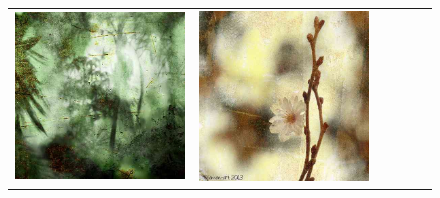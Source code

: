 \begin{figure}
\begin{minipage}[t]{\textwidth}
\begin{tabular}{m{.01\linewidth} m{.16\linewidth} m{.16\linewidth} m{.16\linewidth} m{.16\linewidth} m{.16\linewidth}}
    \includegraphics[width=\linewidth]{../style/figures/flickr_on_flickr/pred_style_Ethereal/1.jpg} &
    \includegraphics[width=\linewidth]{../style/figures/flickr_on_flickr/pred_style_Ethereal/2.jpg} &

\end{tabular}
\end{minipage}
\end{figure}
